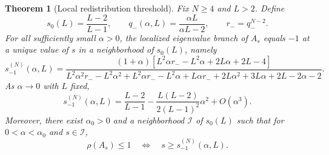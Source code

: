 \documentclass[preprint,12pt]{elsarticle}
\newtheorem{theorem}{Theorem}[section]
\begin{document}
\begin{theorem}[Local redistribution threshold]
\label{thm:criterion}
Fix $N\ge4$ and $L>2$.  Define
\[
    s_0(L)=\frac{L-2}{L-1},
    \qquad
    q_-(\alpha,L)=\frac{\alpha L}{\alpha L-2},
    \qquad
    r_-=q_-^{N-2}.
\]
For all sufficiently small $\alpha>0$, the localized eigenvalue branch of
$A_s$ equals $-1$ at a unique value of $s$ in a neighborhood of $s_0(L)$,
namely
\begin{equation}
 s_{-1}^{(N)}(\alpha,L)
 =
 \frac{(1+\alpha)
 \left[L^2\alpha r_- -L^2\alpha+2L\alpha+2L-4\right]}
 {L^2\alpha^2 r_- -L^2\alpha^2
 +L^2\alpha r_- -L^2\alpha
 +L\alpha r_-+2L\alpha^2+3L\alpha+2L-2\alpha-2}.
 \label{eq:sNexact}
\end{equation}
As $\alpha\to0$ with $L$ fixed,
\begin{equation}
 s_{-1}^{(N)}(\alpha,L)
 =
 \frac{L-2}{L-1}
 -
 \frac{L(L-2)}{2(L-1)^2}\alpha^2
 +O(\alpha^3).
 \label{eq:sNexp}
\end{equation}
Moreover, there exist $\alpha_0>0$ and a neighborhood $\mathcal I$ of
$s_0(L)$ such that for $0<\alpha<\alpha_0$ and $s\in\mathcal I$,
\begin{equation}
    \rho(A_s)\le1
    \quad\Longleftrightarrow\quad
    s\ge s_{-1}^{(N)}(\alpha,L).
    \label{eq:local-equivalence}
\end{equation}
\end{theorem}
\end{document}
